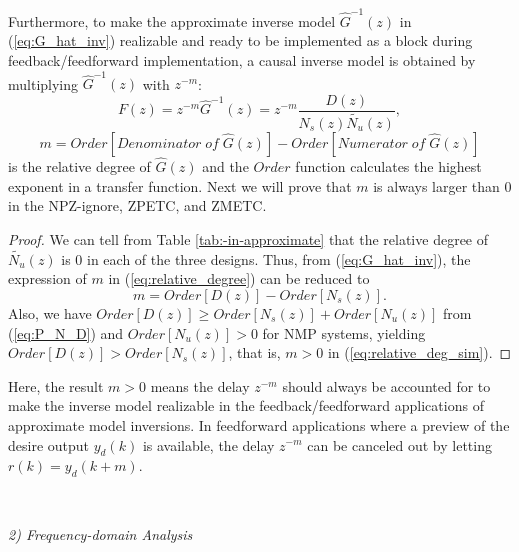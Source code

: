 \documentclass [11pt, proquest] {uwthesis}[2020/02/24]
\begin{document}
Furthermore, to make the approximate inverse model $\hat{G}^{-1}(z)$
in (\ref{eq:G_hat_inv}) realizable and ready to be implemented as
a block during feedback/feedforward implementation, a causal inverse
model is obtained by multiplying $\hat{G}^{-1}(z)$ with $z^{-m}$:
\begin{equation}
F(z)=z^{-m}\hat{G}^{-1}(z)=z^{-m}\frac{D(z)}{N_{s}(z)\tilde{N_{u}}(z)},\label{eq:P_hat_inv}
\end{equation}
\begin{equation}
m=Order[Denominator\;of\;\hat{G}(z)]-Order[Numerator\;of\;\hat{G}(z)]\label{eq:relative_degree}
\end{equation}
is the relative degree of $\hat{G}(z)$ and the $Order$ function
calculates the highest exponent in a transfer function. Next we will
prove that $m$ is always larger than 0 in the NPZ-ignore, ZPETC,
and ZMETC.
\begin{proof}
We can tell from Table \ref{tab:-in-approximate} that the relative
degree of $\tilde{N_{u}}(z)$ is 0 in each of the three designs. Thus,
from (\ref{eq:G_hat_inv}), the expression of $m$ in (\ref{eq:relative_degree})
can be reduced to
\begin{equation}
m=Order[D(z)]-Order[N_{s}(z)].\label{eq:relative_deg_sim}
\end{equation}
Also, we have $Order[D(z)]\geq Order[N_{s}(z)]+Order[N_{u}(z)]$ from
(\ref{eq:P_N_D}) and $Order[N_{u}(z)]>0$ for NMP systems, yielding
$Order[D(z)]>Order[N_{s}(z)]$, that is, $m>0$ in (\ref{eq:relative_deg_sim}). 
\end{proof}
Here, the result $m>0$ means the delay $z^{-m}$ should always be
accounted for to make the inverse model realizable in the feedback/feedforward
applications of approximate model inversions. In feedforward applications
where a preview of the desire output $y_{d}(k)$ is available, the
delay $z^{-m}$ can be canceled out by letting $r(k)=y_{d}(k+m)$.

\

\noindent \emph{2) Frequency-domain Analysis}
\end{document}
